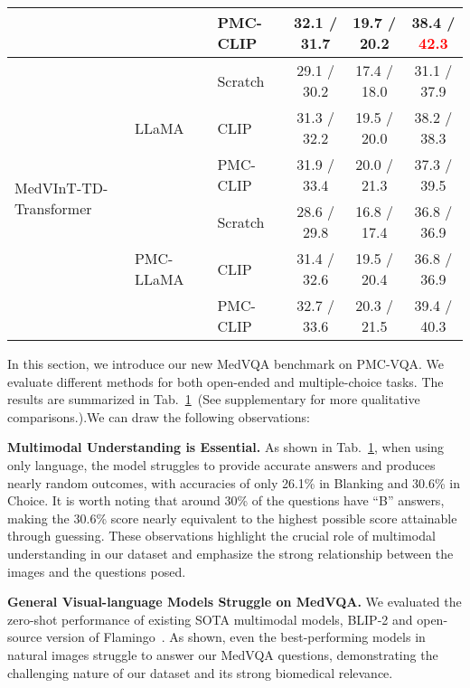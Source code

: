 \documentclass{article}
\begin{document}
\begin{table}[htb]
\begin{tabular}{l|l|l|cc|c}
 & & PMC-CLIP~\cite{lin2023pmcclip}  &   32.1 / 31.7 & 19.7 / 20.2 &  38.4 / \textcolor{red}{\bf 42.3}\\ \midrule
 \multirow{6}{*}{MedVInT-TD-Transformer}     & \multirow{3}{*}{LLaMA\cite{touvron2023llama}} & Scratch  &29.1 / 30.2 & 17.4 / 18.0 & 31.1 / 37.9\\
 & & CLIP~\cite{radford2021learning}     &  31.3 / 32.2 & 19.5 / 20.0 & 38.2 / 38.3\\
 & & PMC-CLIP~\cite{lin2023pmcclip}  & 31.9 / 33.4 & 20.0 /  21.3 & 37.3 / {39.5}\\ \cmidrule{2-6}
 & \multirow{3}{*}{PMC-LLaMA~\cite{wu2023pmcllama}}      & Scratch  & 28.6 / 29.8 &  16.8 / 17.4 & 36.8 / 36.9\\
 & & CLIP~\cite{radford2021learning}     & 31.4 / 32.6 & 19.5 / 20.4 & 36.8 / 36.9\\
 & & PMC-CLIP~\cite{lin2023pmcclip}  & 32.7 / 33.6 & 20.3  / {21.5} & {39.4 / 40.3}\\
 \bottomrule
\end{tabular}
\label{Tab:Benckmark}
\end{table}



In this section, we introduce our new MedVQA benchmark on PMC-VQA. 
We evaluate different methods for both open-ended and multiple-choice tasks. 
The results are summarized in Tab.~\ref{Tab:Benckmark}~({See supplementary for more qualitative comparisons.}).We can draw the following observations:


 \noindent \textbf{Multimodal Understanding is Essential.}
As shown in Tab.~\ref{Tab:Benckmark}, when using only language, the model struggles to provide accurate answers and produces nearly random outcomes, with accuracies of only 26.1\% in Blanking and 30.6\% in Choice. 
It is worth noting that around 30\% of the questions have ``B'' answers, 
making the 30.6\% score nearly equivalent to the highest possible score attainable through guessing. These observations highlight the crucial role of multimodal understanding in our dataset and emphasize the strong relationship between the images and the questions posed.

\noindent \textbf{General Visual-language Models Struggle on MedVQA.}
We evaluated the zero-shot performance of existing SOTA multimodal models, BLIP-2 and open-source version of Flamingo~\cite{li2023blip,awadalla2023openflamingo}.
As shown, even the best-performing models in natural images struggle to answer our MedVQA questions, demonstrating the challenging nature of our dataset and its strong biomedical relevance. 
\end{document}
